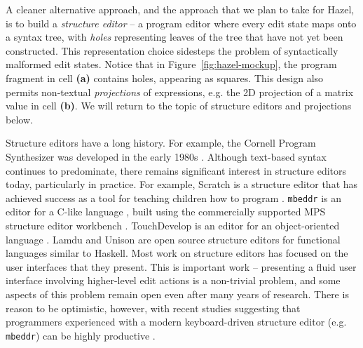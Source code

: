 \documentclass[letterpaper,USenglish]{lipics-v2016}
\newcommand{\Hazel}[0]{\textsf{Hazel}}
\newcommand{\HazelEnv}[0]{\Hazel}
\begin{document}
A cleaner alternative approach, and the approach that we plan to take for \HazelEnv, is to build a
\emph{structure editor} -- a program editor where every edit state
maps onto a syntax tree, with \emph{holes} representing leaves of the tree
that have not yet been constructed.  This representation choice sidesteps the
problem of syntactically malformed edit states. Notice that in
Figure~\ref{fig:hazel-mockup}, the program fragment in cell
\textbf{(a)} contains holes, appearing as squares. This design also permits
non-textual \emph{projections} of expressions, e.g. 
the 2D projection of a matrix value in cell \textbf{(b)}.
We will return to the topic of structure editors and projections below.

Structure editors have a long history. For example, the Cornell Program
Synthesizer was developed in the early 1980s \cite{teitelbaum_cornell_1981}. 
Although text-based syntax continues to predominate, there remains significant   
 interest in structure editors today, particularly in practice. For example,  Scratch is a 
structure editor that has achieved success as a tool for teaching children
how to program \cite{Resnick:2009:SP:1592761.1592779}. \texttt{mbeddr} is an editor for a C-like
language \cite{voelter_mbeddr:_2012}, built using the commercially supported MPS structure editor workbench \cite{voelter2011language}. TouchDevelop is an editor for an
object-oriented language \cite{tillmann_touchdevelop:_2011}. Lamdu \cite{lamdu} and Unison \cite{unison} are open source structure
editors for functional languages similar to Haskell. Most work on structure editors has focused on the user
interfaces that they present. This is important work -- presenting a
fluid user interface involving higher-level edit actions is a non-trivial
problem, and some aspects of this problem remain open even after many years of research. There is reason to be optimistic, however, with recent studies 
suggesting that programmers experienced with a modern keyboard-driven structure editor (e.g. \texttt{mbeddr}) 
can be highly productive \cite{DBLP:conf/vl/Asenov014,DBLP:conf/sle/VolterSBK14}.
\end{document}
